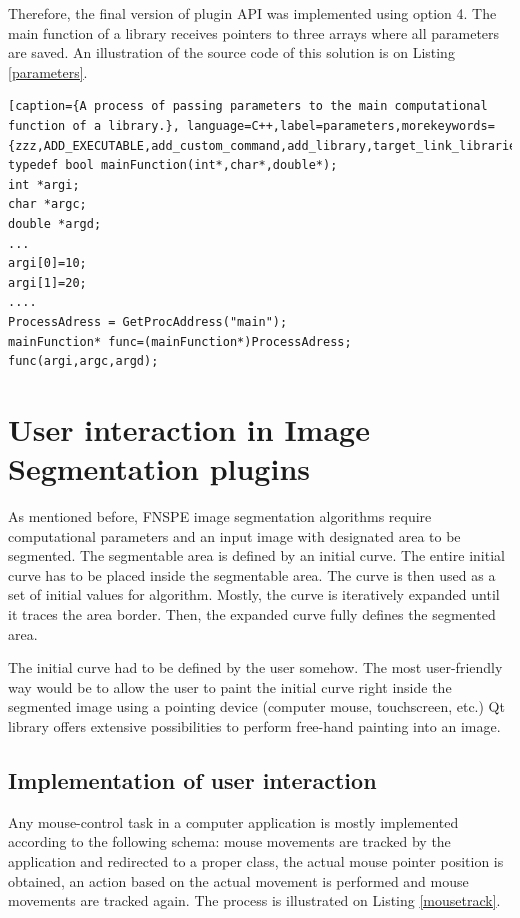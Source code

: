Therefore, the final version of plugin API was implemented using option 4. The main function of a library receives pointers to three arrays where all parameters are saved. An illustration of the source code of this solution is on Listing \ref{parameters}.

\begin{lstlisting}[caption={A process of passing parameters to the main computational function of a library.}, language=C++,label=parameters,morekeywords={zzz,ADD_EXECUTABLE,add_custom_command,add_library,target_link_libraries,OUTPUT,COMMAND,xxx})]
typedef bool mainFunction(int*,char*,double*);
int *argi;
char *argc;
double *argd;
...
argi[0]=10;
argi[1]=20;
....
ProcessAdress = GetProcAddress("main");
mainFunction* func=(mainFunction*)ProcessAdress;
func(argi,argc,argd);
\end{lstlisting}

\section{User interaction in Image Segmentation plugins}

As mentioned before, FNSPE image segmentation algorithms require computational parameters and an input image with designated area to be segmented. The segmentable area is defined by an initial curve. The entire initial curve has to be placed inside the segmentable area. The curve is then used as a set of initial values for algorithm. Mostly, the curve is iteratively expanded until it traces the area border. Then, the expanded curve fully defines the segmented area.

The initial curve had to be defined by the user somehow. The most user-friendly way would be to allow the user to paint the initial curve right inside the segmented image using a pointing device (computer mouse, touchscreen, etc.) Qt library offers extensive possibilities to perform free-hand painting into an image.

\subsection{Implementation of user interaction}

Any mouse-control task in a computer application is mostly implemented according to the following schema: mouse movements are tracked by the application and redirected to a proper class, the actual mouse pointer position is obtained, an action based on the actual movement is performed and mouse movements are tracked again. The process is illustrated on Listing \ref{mousetrack}.

